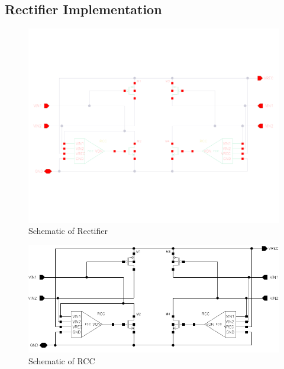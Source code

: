 \documentclass[UKenglish]{ifimaster}  %
\begin{document}
\begin{appendices} 	%
\makeatletter
{}
\makeatother

\chapter{Rectifier Implementation}

\begin{figure} [!htbp]	%
 	\centering
  	\includegraphics[width=\textwidth]{appendix/schematic_rectifier_l.pdf} 
 	\caption{Schematic of Rectifier} 
	\label{fig:appen_schematic_rectifer} 
\end{figure}

\begin{figure} [!htbp]	%
 	\centering
  	\includegraphics[width=\textwidth]{appendix/schematic_rectifier_bw.pdf} 
 	\caption{Schematic of RCC} 
	\label{fig:appen_schematic_rcc} 
\end{figure}


\end{appendices}
\end{document}
